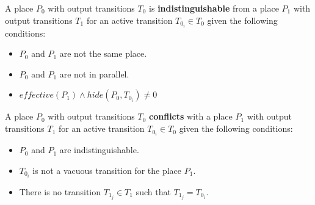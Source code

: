 \begin{definition}
A place $P_0$ with output transitions $T_0$ is \textbf{indistinguishable} from a place $P_1$ with output transitions $T_1$  for an active transition $T_{0_i} \in T_0$ given the following conditions:
\begin{itemize}
\item $P_0$ and $P_1$ are not the same place.
\item $P_0$ and $P_1$ are not in parallel.
\item $effective(P_1) \wedge hide(P_0, T_{0_i}) \ne 0$
\end{itemize}
\end{definition}

\begin{definition}
A place $P_0$ with output transitions $T_0$ \textbf{conflicts} with a place $P_1$ with output transitions $T_1$ for an active transition $T_{0_i} \in T_0$ given the following conditions:
\begin{itemize}
\item $P_0$ and $P_1$ are indistinguishable.
\item $T_{0_i}$ is not a vacuous transition for the place $P_1$.
\item There is no transition $T_{1_j} \in T_1$ such that $T_{1_j} = T_{0_i}$.
\end{itemize}
\end{definition}